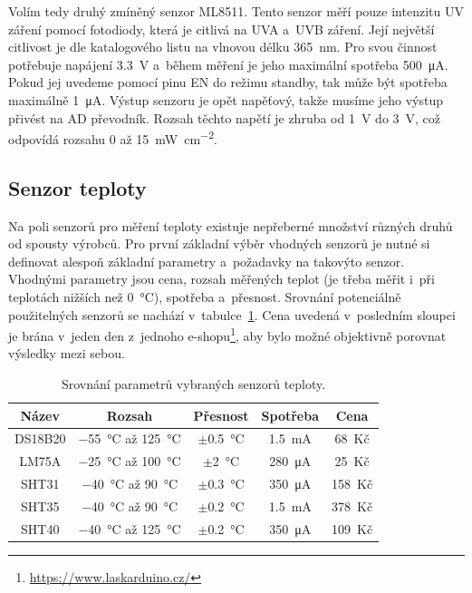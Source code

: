 Volím tedy druhý zmíněný senzor ML8511. Tento senzor měří pouze intenzitu UV záření pomocí fotodiody, která je citlivá na UVA a~UVB záření. Její největší citlivost je dle katalogového listu \cite{dat_ML8511} na vlnovou délku \SI{365}{\nano\metre}. Pro svou činnost potřebuje napájení \SI{3,3}{\volt} a~během měření je jeho maximální spotřeba \SI{500}{\micro\ampere}. Pokud jej uvedeme pomocí pinu EN do režimu standby, tak může být spotřeba maximálně \SI{1}{\micro\ampere}. Výstup senzoru je opět napěťový, takže musíme jeho výstup přivést na AD převodník. Rozsah těchto napětí je zhruba od \SI{1}{\volt} do \SI{3}{\volt}, což odpovídá rozsahu \SI{0}{} až \SI{15}{\milli\watt\per\centi\metre\squared}.

\subsection{Senzor teploty}

Na poli senzorů pro měření teploty existuje nepřeberné množství různých druhů od spousty výrobců. Pro první základní výběr vhodných senzorů je nutné si definovat alespoň základní parametry a~požadavky na takovýto senzor. Vhodnými parametry jsou cena, rozsah měřených teplot (je třeba měřit i~při teplotách nižších než \SI{0}{\celsius}), spotřeba a~přesnost. Srovnání potenciálně použitelných senzorů se nachází v~tabulce~\ref{tab_TemperatureSensors}. Cena uvedená v~posledním sloupci je brána v~jeden den z~jednoho e-shopu\footnote{\url{https://www.laskarduino.cz/}}, aby bylo možné objektivně porovnat výsledky mezi sebou.

\begin{table}[b]
    \caption{Srovnání parametrů vybraných senzorů teploty.}
    \centering
    \begin{tabular}{c|cccc}
    \textbf{Název} & \textbf{Rozsah}                         & \textbf{Přesnost}       & \textbf{Spotřeba}       & \textbf{Cena} \\ \hline
    DS18B20 \cite{dat_DS18B20}        & \SI{-55}{\celsius} až \SI{125}{\celsius} & $\pm$\SI{0,5}{\celsius} & \SI{1,5}{\milli\ampere} & 68~Kč         \\
    LM75A \cite{dat_LM75A}          & \SI{-25}{\celsius} až \SI{100}{\celsius} & $\pm$\SI{2}{\celsius}   & \SI{280}{\micro\ampere} & 25~Kč         \\
    SHT31 \cite{dat_SHT31}          & \SI{-40}{\celsius} až \SI{90}{\celsius}  & $\pm$\SI{0,3}{\celsius} & \SI{350}{\micro\ampere} & 158~Kč        \\
    SHT35 \cite{dat_SHT35}          & \SI{-40}{\celsius} až \SI{90}{\celsius}  & $\pm$\SI{0,2}{\celsius} & \SI{1,5}{\milli\ampere} & 378~Kč        \\
    SHT40 \cite{dat_SHT40}          & \SI{-40}{\celsius} až \SI{125}{\celsius} & $\pm$\SI{0,2}{\celsius} & \SI{350}{\micro\ampere} & 109~Kč             
    \end{tabular}
    \label{tab_TemperatureSensors}
\end{table}

